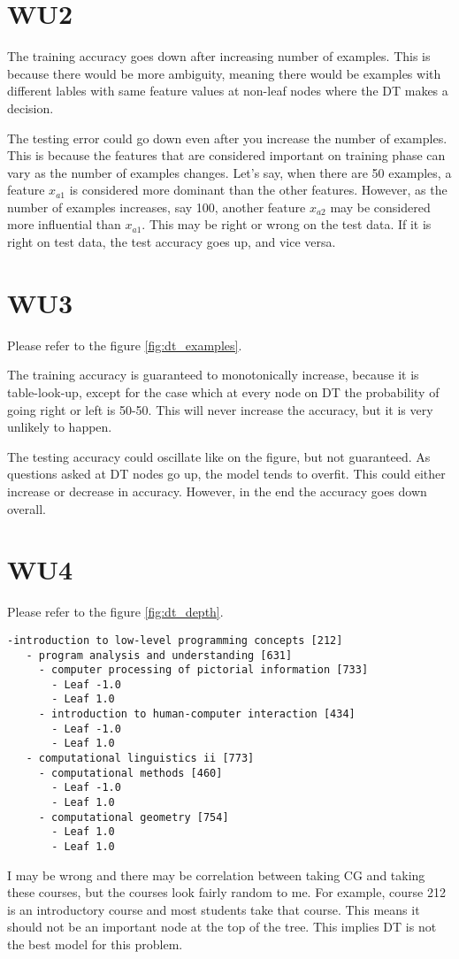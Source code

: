 \section*{WU2}
The training accuracy goes down after increasing number of examples. This is because there would be more ambiguity, meaning there would be examples with different lables with same feature values at non-leaf nodes where the DT makes a decision.

The testing error could go down even after you increase the number of examples. This is because the features that are considered important on training phase can vary as the number of examples changes. Let's say, when there are 50 examples, a feature $x_{a1}$ is considered more dominant than the other features. However, as the number of examples increases, say 100, another feature $x_{a2}$ may be considered more influential than $x_{a1}$. This may be right or wrong on the test data. If it is right on test data, the test accuracy goes up, and vice versa.

\section*{WU3}

Please refer to the figure \ref{fig:dt_examples}.

The training accuracy is guaranteed to monotonically increase, because it is table-look-up, except for the case which at every node on DT the probability of going right or left is 50-50. This will never increase the accuracy, but it is very unlikely to happen. 

The testing accuracy could oscillate like on the figure, but not guaranteed. As questions asked at DT nodes go up, the model tends to overfit. This could either increase or decrease in accuracy. However, in the end the accuracy goes down overall.

\section*{WU4}

Please refer to the figure \ref{fig:dt_depth}.
  \begin{verbatim}
-introduction to low-level programming concepts [212]
   - program analysis and understanding [631]
     - computer processing of pictorial information [733]
       - Leaf -1.0
       - Leaf 1.0
     - introduction to human-computer interaction [434]
       - Leaf -1.0
       - Leaf 1.0
   - computational linguistics ii [773]
     - computational methods [460]
       - Leaf -1.0
       - Leaf 1.0
     - computational geometry [754]
       - Leaf 1.0
       - Leaf 1.0
  \end{verbatim}
I may be wrong and there may be correlation between taking CG and taking these courses, but the courses look fairly random to me. For example, course 212 is an introductory course and most students take that course. This means it should not be an important node at the top of the tree. This implies DT is not the best model for this problem.

